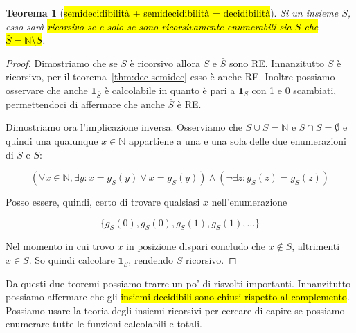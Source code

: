 \documentclass[a4paper,11pt,oneside]{article}
\theoremstyle{plain}
\newtheorem{thm}{Teorema}[section]
\theoremstyle{definition}
\theoremstyle{remark}
\begin{document}
\begin{thm}[\hl{semidecidibilità + semidecidibilità = decidibilità}]\label{thm:0.5+0.5=1}
  Si un insieme $S$, esso sarà \hl{ricorsivo se e solo se sono ricorsivamente
  enumerabili sia $S$ che $\bar{S} = \mathbb{N} \setminus S$}.
\end{thm}
\begin{proof}
  Dimostriamo che se $S$ è ricorsivo allora $S$ e $\bar{S}$ sono RE\@.
  Innanzitutto $S$ è ricorsivo, per il teorema~\ref{thm:dec-semidec} esso è
  anche RE\@. Inoltre possiamo osservare che anche $\mathbf{1}_{\bar{S}}$ è
  calcolabile in quanto è pari a $\mathbf{1}_S$ con 1 e 0 scambiati,
  permettendoci di affermare che anche $\bar{S}$ è RE\@.

  Dimostriamo ora l'implicazione inversa. Osserviamo che $S \cup \bar{S} =
  \mathbb{N}$ e $S \cap \bar{S} = \emptyset$ e quindi una qualunque $x \in
  \mathbb{N}$ appartiene a una e una sola delle due enumerazioni di $S$ e
  $\bar{S}$:

  \[
    (\forall x \in \mathbb{N}, \exists y : x = g_{\bar{S}}(y) \lor x = g_S(y))
      \land (\neg \exists z : g_{\bar{S}}(z) = g_S(z))
  \]

  Posso essere, quindi, certo di trovare qualsiasi $x$ nell'enumerazione

  \[
    \{ g_S(0), g_{\bar{S}}(0), g_S(1), g_{\bar{S}}(1), \ldots \}
  \]

  Nel momento in cui trovo $x$ in posizione dispari concludo che $x \notin S$,
  altrimenti $x \in S$. So quindi calcolare $\mathbf{1}_S$, rendendo $S$
  ricorsivo.
\end{proof}

Da questi due teoremi possiamo trarre un po' di risvolti importanti.
Innanzitutto possiamo affermare che gli \hl{insiemi decidibili sono chiusi
rispetto al complemento}. Possiamo usare la teoria degli insiemi ricorsivi per
cercare di capire se possiamo enumerare tutte le funzioni calcolabili e totali.
\end{document}

